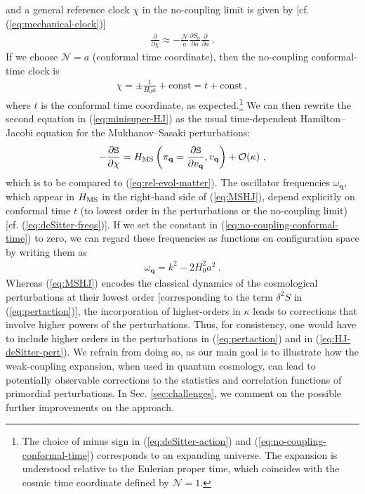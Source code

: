 \documentclass[12pt]{iopart}
\def\eq#1{\begin{equation}\begin{aligned}#1\end{aligned}\end{equation}}
\def\eref#1{(\ref{eq:#1})}
\def\del#1#2{\frac{\partial#1}{\partial#2}}
\def\S{\mathtt{S}}
\def\Ob{\mathcal{O}}
\def\N{\mathcal{N}}
\def\q{\mathbf{q}}
\begin{document}
and a general reference clock $\chi$ in the no-coupling limit is given by [cf. \eref{mechanical-clock}]
\eq{
\del{}{\chi} \approx -\frac{\N}{a}\del{S_0}{a}\del{}{a} \ .
}
If we choose $\N = a$ (conformal time coordinate), then the no-coupling conformal-time clock is
\eq{\label{eq:no-coupling-conformal-time}
\chi = \pm\frac{1}{H_0a} + \text{const} = t + \text{const} \ ,
}
where $t$ is the conformal time coordinate, as expected.\footnote{The choice of minus sign in \eref{deSitter-action} and \eref{no-coupling-conformal-time} corresponds to an expanding universe. The expansion is understood relative to the Eulerian proper time, which coincides with the cosmic time coordinate defined by $\N=1$.} We can then rewrite the second equation in \eref{minisuper-HJ} as the usual time-dependent Hamilton--Jacobi equation for the Mukhanov--Sasaki perturbations:
\eq{\label{eq:MSHJ}
-\del{\S}{\chi} = H_{\rm MS}\left(\pi_{\q}=\del{\S}{v_{\q}},v_{\q}\right)+\Ob(\kappa) \ ,
}
which is to be compared to \eref{rel-evol-matter}. The oscillator frequencies $\omega_{\q}$, which appear in $H_{\rm MS}$ in the right-hand side of \eref{MSHJ}, depend explicitly on conformal time $t$ (to lowest order in the perturbations or the no-coupling limit) [cf. \eref{deSitter-freqs}]. If we set the constant in \eref{no-coupling-conformal-time} to zero, we can regard these frequencies as functions on configuration space by writing them as
\eq{\label{eq:deSitter-freqs-c}
\omega_{\q} = k^2-2H_0^2a^2 \ .
}
Whereas \eref{MSHJ} encodes the classical dynamics of the cosmological perturbations at their lowest order [corresponding to the term $\delta^2 S$ in \eref{pertaction}], the incorporation of higher-orders in $\kappa$ leads to corrections that involve higher powers of the perturbations. Thus, for consistency, one would have to include higher orders in the perturbations in \eref{pertaction} and in \eref{HJ-deSitter-pert}. We refrain from doing so, as our main goal is to illustrate how the weak-coupling expansion, when used in quantum cosmology, can lead to potentially observable corrections to the statistics and correlation functions of primordial perturbations. In Sec. \ref{sec:challenges}, we comment on the possible further improvements on the approach.
\end{document}

